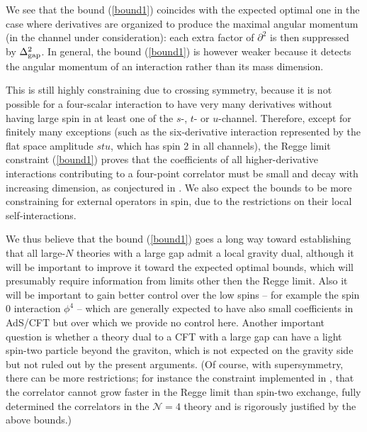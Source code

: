 \documentclass[11pt, reqno,preprint]{article}
\begin{document}
We see that the bound (\ref{bound1}) coincides with the expected optimal one
in the case where derivatives are organized to produce the maximal angular momentum (in the channel under consideration):
each extra factor of $\partial^2$ is then suppressed by $\Delta_{\rm gap}^2$.
In general, the bound (\ref{bound1}) is however weaker because it detects the angular momentum of an interaction
rather than its mass dimension.

This is still highly constraining due to crossing symmetry, because it is not possible
for a four-scalar interaction to have very many derivatives without having large spin in at least one of the $s$-, $t$- or $u$-channel.
Therefore, except for finitely many exceptions (such as the six-derivative interaction represented by the flat space amplitude $stu$,
which has spin 2 in all channels), the Regge limit constraint (\ref{bound1}) proves that the coefficients of all higher-derivative interactions contributing to a four-point correlator must be small and decay with increasing
dimension, as conjectured in \cite{Heemskerk:2009pn}.  We also expect the bounds to be more constraining for external operators in spin,
due to the restrictions on their local self-interactions.

We thus believe that the bound (\ref{bound1}) goes a long way toward establishing that all large-$N$ theories with a large gap
admit a local gravity dual, although it will be important to improve it toward the expected optimal bounds, which
will presumably require information from limits other then the Regge limit.  Also it will be important to gain better control over the low spins -- for example the spin 0 interaction $\phi^4$ -- which are generally expected to have also small coefficients in AdS/CFT
but over which we provide no control here.  Another important question is whether a theory dual to a CFT
with a large gap can have a light spin-two particle beyond the graviton, which is not expected on the gravity side but not ruled out by the present arguments.  (Of course, with supersymmetry, there can be more restrictions; for instance the constraint implemented in \cite{Rastelli:2016nze},
that the correlator cannot grow faster in the Regge limit than spin-two exchange, fully determined the correlators
in the $\mathcal{N}=4$ theory and is rigorously justified by the above bounds.)
\end{document}
